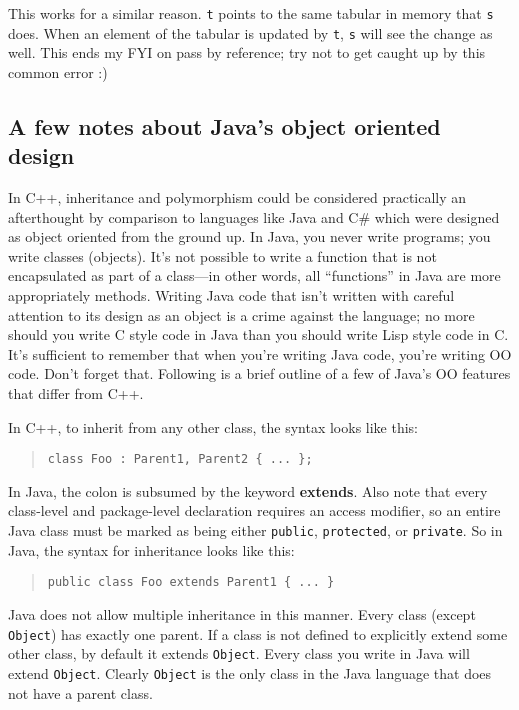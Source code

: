 \documentclass[12pt]{article}
\begin{document}
This works for a similar reason.  \texttt{t} points to the same
tabular in memory that \texttt{s} does.  When an element of the
tabular is updated by \texttt{t}, \texttt{s} will see the change as
well.  This ends my FYI on pass by reference; try not to get caught up
by this common error :)

\subsection{A few notes about Java's object oriented design}

In C++, inheritance and polymorphism could be considered practically
an afterthought by comparison to languages like Java and C\# which
were designed as object oriented from the ground up.  In Java, you
never write programs; you write classes (objects).  It's not possible
to write a function that is not encapsulated as part of a class---in
other words, all ``functions'' in Java are more appropriately methods.
Writing Java code that isn't written with careful attention to its
design as an object is a crime against the language; no more should
you write C style code in Java than you should write Lisp style code
in C.  It's sufficient to remember that when you're writing Java code,
you're writing OO code.  Don't forget that.  Following is a brief
outline of a few of Java's OO features that differ from C++.

In C++, to inherit from any other class, the syntax looks like this:
\begin{quote}
\begin{verbatim}
class Foo : Parent1, Parent2 { ... };
\end{verbatim}
\end{quote}

In Java, the colon is subsumed by the keyword \textbf{extends}.  Also
note that every class-level and package-level declaration requires an
access modifier, so an entire Java class must be marked as being
either \texttt{public}, \texttt{protected}, or \texttt{private}.  So
in Java, the syntax for inheritance looks like this:
\begin{quote}
\begin{verbatim}
public class Foo extends Parent1 { ... }
\end{verbatim}
\end{quote}

Java does not allow multiple inheritance in this manner.  Every class
(except \texttt{Object}) has exactly one parent.  If a class is not
defined to explicitly extend some other class, by default it extends
\texttt{Object}.  Every class you write in Java will extend
\texttt{Object}.  Clearly \texttt{Object} is the only class in the
Java language that does not have a parent class.
\end{document}
